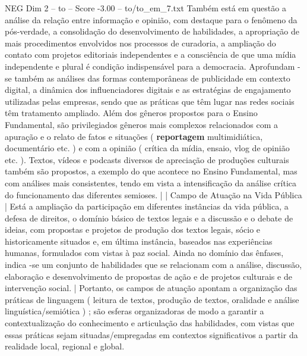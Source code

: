\begin{textsample}{NEG Dim 2 – to – Score -3.00 – to/to\_em\_7.txt}
Também está em questão a análise da relação entre informação e opinião, com destaque para o fenômeno da pós-verdade, a consolidação do desenvolvimento de habilidades, a apropriação de mais procedimentos envolvidos nos processos de curadoria, a ampliação do contato com projetos editoriais independentes e a consciência de que uma mídia independente e plural é condição indispensável para a democracia.
Aprofundam -se também as análises das formas contemporâneas de publicidade em contexto digital, a dinâmica dos influenciadores digitais e as estratégias de engajamento utilizadas pelas empresas, sendo que as práticas que têm lugar nas redes sociais têm tratamento ampliado.
Além dos gêneros propostos para o Ensino Fundamental, são privilegiados gêneros mais complexos relacionados com a apuração e o relato de fatos e situações ( \textbf{reportagem} multimidiática, documentário etc. ) e com a opinião ( crítica da mídia, ensaio, vlog de opinião etc. ).
Textos, vídeos e podcasts diversos de apreciação de produções culturais também são propostos, a exemplo do que acontece no Ensino Fundamental, mas com análises mais consistentes, tendo em vista a intensificação da análise crítica do funcionamento das diferentes semioses. | | Campo de Atuação na Vida Pública | Está a ampliação da participação em diferentes instâncias da vida pública, a defesa de direitos, o domínio básico de textos legais e a discussão e o debate de ideias, com propostas e projetos de produção dos textos legais, sócio e historicamente situados e, em última instância, baseados nas experiências humanas, formulados com vistas à paz social.
Ainda no domínio das ênfases, indica -se um conjunto de habilidades que se relacionam com a análise, discussão, elaboração e desenvolvimento de propostas de ação e de projetos culturais e de intervenção social. | Portanto, os campos de atuação apontam a organização das práticas de linguagem ( leitura de textos, produção de textos, oralidade e análise linguística/semiótica ) ; são esferas organizadoras de modo a garantir a contextualização do conhecimento e articulação das habilidades, com vistas que essas práticas sejam situadas/empregadas em contextos significativos a partir da realidade local, regional e global.

\end{textsample}
